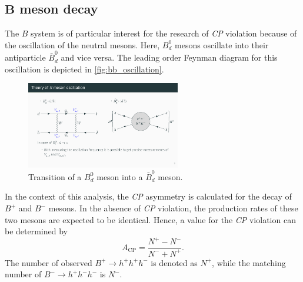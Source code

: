 \subsection{$\symbf{B}$ meson decay}
The $B$ system is of particular interest for the research of \textit{CP} violation because of the oscillation of the neutral mesons. Here, $B_d^0$ mesons 
oscillate into their antiparticle $\bar{B}_d^0$ and vice versa. The leading order Feynman diagram for this oscillation is depicted in \autoref{fig:bb_oscillation}.
\begin{figure}
    \centering
    \includegraphics[width=0.6\textwidth]{content/pics/bb_oscillation.pdf}
    \caption{Transition of a $B_d^0$ meson into a $\bar{B}_d^0$ meson.}
    \label{fig:bb_oscillation}
\end{figure}

In the context of this analysis, the \textit{CP} asymmetry is calculated for the decay of $B^+$ and $B^-$ mesons. In the absence of \textit{CP} violation, 
the production rates of these two mesons are expected to be identical. Hence, a value for the \textit{CP} violation can be determined by
\begin{equation}
    A_{\mathrm{CP}} = \frac{N^+-N^-}{N^-+N^+}.
    \label{eq:CP_asymmetry}
\end{equation}
The number of observed $B^+ \rightarrow h^+h^+h^-$ is denoted as $N^+$, while the matching number of $B^- \rightarrow h^+h^-h^-$ is $N^-$.
